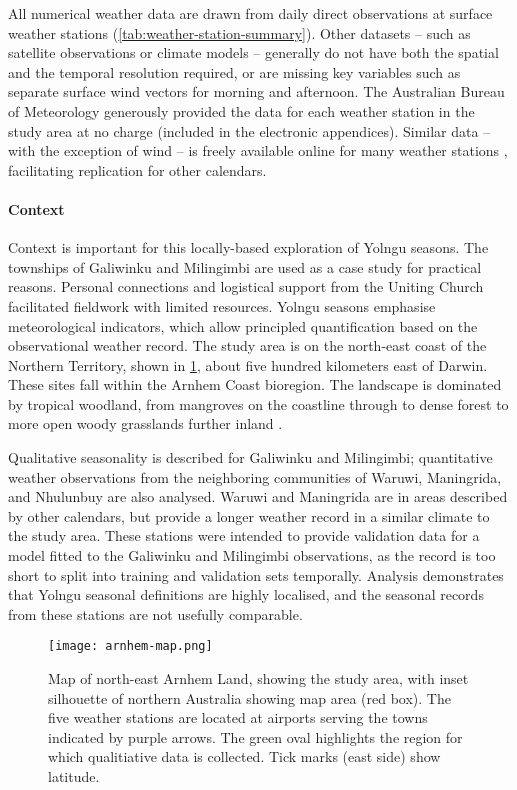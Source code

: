 All numerical weather data are drawn from daily direct observations at
surface weather stations (\cref{tab:weather-station-summary}).
Other datasets -- such as satellite observations or
climate models -- generally do not have both the spatial and the
temporal resolution required, or are missing key variables such as separate
surface wind vectors for morning and afternoon.
%
%
The Australian Bureau of Meteorology generously provided the data for each
weather station in the study area at no charge (included in the electronic appendices).
Similar data -- with the exception of wind -- is freely available online
for many weather stations , facilitating replication for other
calendars.


\paragraph{Context}
Context is important for this locally-based exploration of Yolngu seasons.
The townships of Galiwinku and Milingimbi are used as a case study for
practical reasons.  Personal connections and
logistical support from the Uniting Church facilitated fieldwork with limited
resources.  Yolngu seasons emphasise meteorological indicators, which allow
principled quantification based on the observational weather record.
%
The study area is on the north-east coast of the Northern Territory, shown
in  \cref{fig:arnhem-map}, about five hundred kilometers east of Darwin.
These sites fall within the Arnhem Coast bioregion.  The landscape is
dominated by tropical woodland, from mangroves on the coastline through
to dense forest to more open woody grasslands further inland \citep{ens2014}.


Qualitative seasonality is described for Galiwinku and Milingimbi;
quantitative weather observations from the neighboring communities of Waruwi, Maningrida, and Nhulunbuy
are also analysed.  Waruwi and Maningrida are in areas described by
other calendars, but provide a longer weather record in a similar climate
to the study area.
%
These stations were intended to provide validation data for a model fitted
to the Galiwinku and Milingimbi observations, as the record is too short to
split into training and validation sets temporally.  Analysis demonstrates
that Yolngu seasonal definitions are highly localised, and the seasonal
records from these stations are not usefully comparable.


\begin{figure}[t]
    \centering
    \texttt{[image: arnhem-map.png]}
    \caption[Map of north-east Arnhem Land, showing the study area]{
        Map of north-east Arnhem Land, showing the study area, with inset silhouette
        of northern Australia showing map area (red box).  The five weather
        stations are located at airports serving the towns indicated by purple
        arrows.  The green oval highlights the region for which qualitiative
        data is collected.  Tick marks (east side) show latitude.}
    \label{fig:arnhem-map}
\end{figure}



